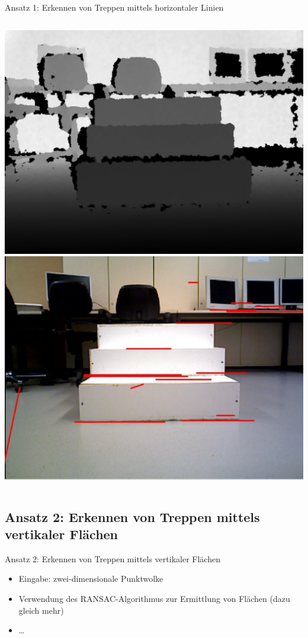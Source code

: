 \documentclass[18pt]{beamer}
\begin{document}
\begin{frame}{Ansatz 1: Erkennen von Treppen mittels horizontaler Linien}
\begin{columns}
			\includegraphics[scale=0.16]{images/canny01.pdf}\newline
			\includegraphics[scale=0.16]{images/canny03.pdf}
	\end{columns}
\end{frame}


\subsection{Ansatz 2: Erkennen von Treppen mittels vertikaler Flächen}
\begin{frame}{Ansatz 2: Erkennen von Treppen mittels vertikaler Flächen}
	\begin{itemize}
		\item Eingabe: zwei-dimensionale Punktwolke
		\item Verwendung des RANSAC-Algorithmus zur Ermittlung von Flächen (dazu gleich mehr)
		\item \dots
	\end{itemize}
\end{frame}
\end{document}
